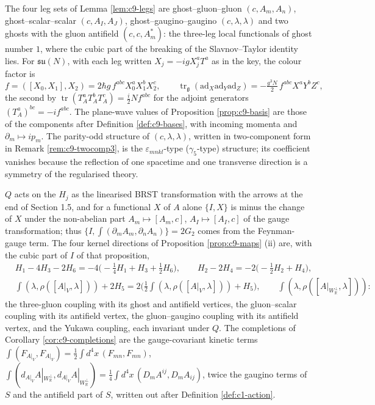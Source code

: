 \begin{remark}
The four leg sets of Lemma \ref{lem:c9-legs} are ghost--gluon--gluon $(c,A_m,A_n)$, ghost--scalar--scalar $(c,A_I,A_J)$, ghost--gaugino--gaugino $(c,\lambda,\lambda)$ and two ghosts with the gluon antifield $(c,c,A^*_m)$: the three-leg local functionals of ghost number $1$, where the cubic part of the breaking of the Slavnov--Taylor identity lies. For $\mathfrak{su}(N)$, with each leg written $X_j=-igX_j^aT^a$ as in the key, the colour factor is
\[
f=([X_0,X_1],X_2)=2\hbar g\,f^{abc}X_0^aX_1^bX_2^c,\qquad \operatorname{tr}_{\mathfrak g}(\mathrm{ad}_X\mathrm{ad}_Y\mathrm{ad}_Z)=-\tfrac{g^3N}2\,f^{abc}X^aY^bZ^c,
\]
the second by $\operatorname{tr}(T^a_AT^b_AT^c_A)=\tfrac i2N f^{abc}$ for the adjoint generators $(T^a_A)^{bc}=-if^{abc}$. The plane-wave values of Proposition \ref{prop:c9-basis} are those of the components after Definition \ref{def:c9-bases}, with incoming momenta and $\partial_m\mapsto ip_m$. The parity-odd structure of $(c,\lambda,\lambda)$, written in two-component form in Remark \ref{rem:c9-twocomp3}, is the $\varepsilon_{mnkl}$-type ($\gamma_5$-type) structure; its coefficient vanishes because the reflection of one spacetime and one transverse direction is a symmetry of the regularised theory.
\end{remark}

\begin{remark}
$Q$ acts on the $H_j$ as the linearised BRST transformation with the arrows at the end of Section 1.5, and for a functional $X$ of $A$ alone $\{I,X\}$ is minus the change of $X$ under the non-abelian part $A_m\mapsto[A_m,c]$, $A_I\mapsto[A_I,c]$ of the gauge transformation; thus $\{I,\int(\partial_mA_m,\partial_nA_n)\}=2G_2$ comes from the Feynman-gauge term. The four kernel directions of Proposition \ref{prop:c9-maps} (ii) are, with the cubic part of $I$ of that proposition,
\[
\begin{aligned}
&H_1-4H_3-2H_6=-4\big(-\tfrac14H_1+H_3+\tfrac12H_6\big),\qquad H_2-2H_4=-2\big(-\tfrac12H_2+H_4\big),\\
&\int(\lambda,\rho([A|_V,\lambda]))+2H_5=2\Big(\tfrac12\int(\lambda,\rho([A|_V,\lambda]))+H_5\Big),\qquad \int(\lambda,\rho([A|_{W_{\mathbb R}^\perp},\lambda])):
\end{aligned}
\]
the three-gluon coupling with its ghost and antifield vertices, the gluon--scalar coupling with its antifield vertex, the gluon--gaugino coupling with its antifield vertex, and the Yukawa coupling, each invariant under $Q$. The completions of Corollary \ref{cor:c9-completions} are the gauge-covariant kinetic terms $\int(F_{A|_V},F_{A|_V})=\tfrac12\int d^4x\,(F_{mn},F_{mn})$, $\int(d_{A|_V}A|_{W_{\mathbb R}^\perp},d_{A|_V}A|_{W_{\mathbb R}^\perp})=\tfrac14\int d^4x\,(D_mA^{ij},D_mA_{ij})$, twice the gaugino terms of $S$ and the antifield part of $S$, written out after Definition \ref{def:c1-action}.
\end{remark}

